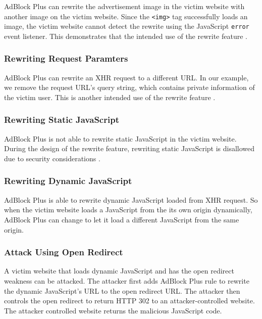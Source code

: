 \documentclass[conference]{IEEEtran}
\begin{document}
AdBlock Plus can rewrite the advertisement image in the victim website with another image on the victim website. Since the \lstinline{<img>} tag successfully loads an image, the victim website cannot detect the rewrite using the JavaScript \lstinline{error} event listener. This demonstrates that the intended use of the rewrite feature \cite{abp_filter_guide}.

\subsubsection{Rewriting Request Paramters}

AdBlock Plus can rewrite an XHR request to a different URL. In our example, we remove the request URL's query string, which contains private information of the victim user. This is another intended use of the rewrite feature \cite{abp_issue_6622}.

\subsubsection{Rewriting Static JavaScript}

AdBlock Plus is not able to rewrite static JavaScript in the victim website. During the design of the rewrite feature, rewriting static JavaScript is disallowed due to security considerations \cite{abp_issue_6622}.

\subsubsection{Rewriting Dynamic JavaScript}

AdBlock Plus is able to rewrite dynamic JavaScript loaded from XHR request. So when the victim website loads a JavaScript from the its own origin dynamically, AdBlock Plus can change to let it load a different JavaScript from the same origin.

\subsubsection{Attack Using Open Redirect}

A victim website that loads dynamic JavaScript and has the open redirect weakness can be attacked. The attacker first adds AdBlock Plus rule to rewrite the dynamic JavaScript's URL to the open redirect URL. The attacker then controls the open redirect to return HTTP 302 to an attacker-controlled website. The attacker controlled website returns the malicious JavaScript code.
\end{document}
